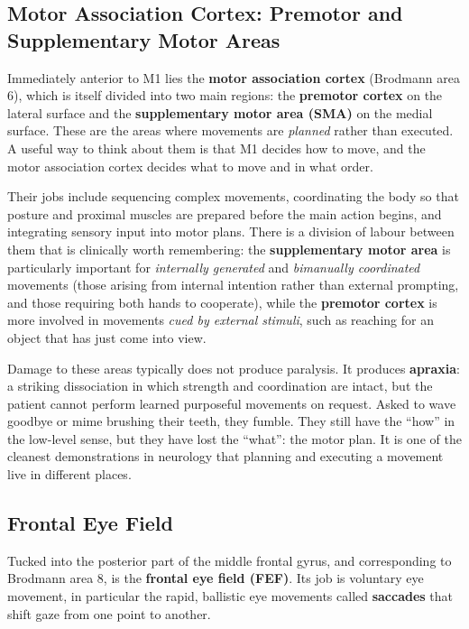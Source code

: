 \documentclass[11pt]{article}
\begin{document}
\subsection{Motor Association Cortex: Premotor and Supplementary Motor Areas}

Immediately anterior to M1 lies the \textbf{motor association cortex} (Brodmann area 6), which is itself divided into two main regions: the \textbf{premotor cortex} on the lateral surface and the \textbf{supplementary motor area (SMA)} on the medial surface. These are the areas where movements are \textit{planned} rather than executed. A useful way to think about them is that M1 decides how to move, and the motor association cortex decides what to move and in what order.

Their jobs include sequencing complex movements, coordinating the body so that posture and proximal muscles are prepared before the main action begins, and integrating sensory input into motor plans. There is a division of labour between them that is clinically worth remembering: the \textbf{supplementary motor area} is particularly important for \textit{internally generated} and \textit{bimanually coordinated} movements (those arising from internal intention rather than external prompting, and those requiring both hands to cooperate), while the \textbf{premotor cortex} is more involved in movements \textit{cued by external stimuli}, such as reaching for an object that has just come into view.

Damage to these areas typically does not produce paralysis. It produces \textbf{apraxia}: a striking dissociation in which strength and coordination are intact, but the patient cannot perform learned purposeful movements on request. Asked to wave goodbye or mime brushing their teeth, they fumble. They still have the ``how'' in the low-level sense, but they have lost the ``what'': the motor plan. It is one of the cleanest demonstrations in neurology that planning and executing a movement live in different places.

\subsection{Frontal Eye Field}

Tucked into the posterior part of the middle frontal gyrus, and corresponding to Brodmann area 8, is the \textbf{frontal eye field (FEF)}. Its job is voluntary eye movement, in particular the rapid, ballistic eye movements called \textbf{saccades} that shift gaze from one point to another.
\end{document}
